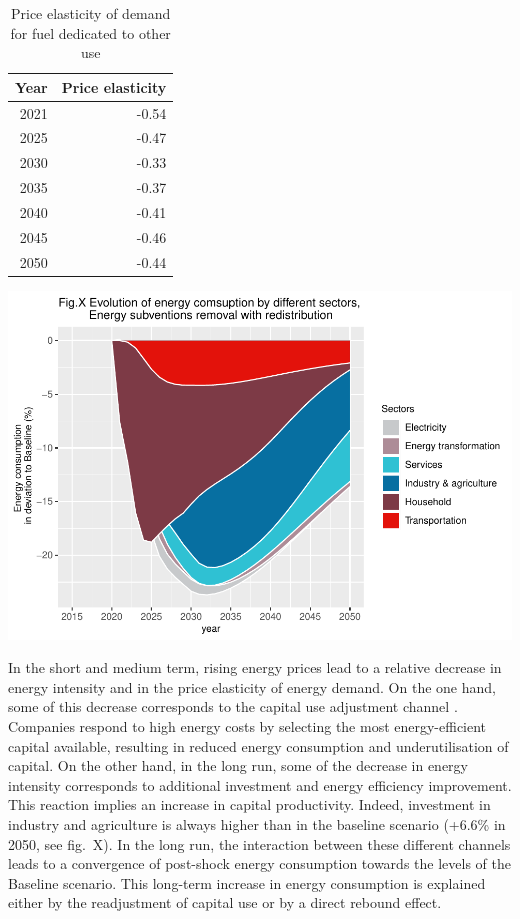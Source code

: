 \documentclass[
]{article}
\begin{document}
\begin{table}[!h]

\caption{\label{tab:unnamed-chunk-32}Price elasticity of demand for fuel dedicated to other use}
\centering
\fontsize{7}{9}\selectfont
\begin{tabular}[t]{rr}
\toprule
\textbf{Year} & \textbf{Price elasticity}\\
\midrule
2021 & -0.54\\
2025 & -0.47\\
2030 & -0.33\\
2035 & -0.37\\
2040 & -0.41\\
2045 & -0.46\\
2050 & -0.44\\
\bottomrule
\end{tabular}
\end{table}

\begin{center}\includegraphics[width=0.7\linewidth,height=0.7\textheight]{Modele-ThreeMe-Tunisie_Sequeira_Valilou_Wang_files/figure-latex/unnamed-chunk-33-1} \end{center}

In the short and medium term, rising energy prices lead to a relative
decrease in energy intensity and in the price elasticity of energy
demand. On the one hand, some of this decrease corresponds to the
capital use adjustment channel \autocites[ ]{finn2000}[
]{gamtessa2018a}. Companies respond to high energy costs by selecting
the most energy-efficient capital available, resulting in reduced energy
consumption and underutilisation of capital. On the other hand, in the
long run, some of the decrease in energy intensity corresponds to
additional investment and energy efficiency improvement. This reaction
implies an increase in capital productivity. Indeed, investment in
industry and agriculture is always higher than in the baseline scenario
(+6.6\% in 2050, see fig.~X). In the long run, the interaction between
these different channels leads to a convergence of post-shock energy
consumption towards the levels of the Baseline scenario. This long-term
increase in energy consumption is explained either by the readjustment
of capital use or by a direct rebound effect.
\end{document}
